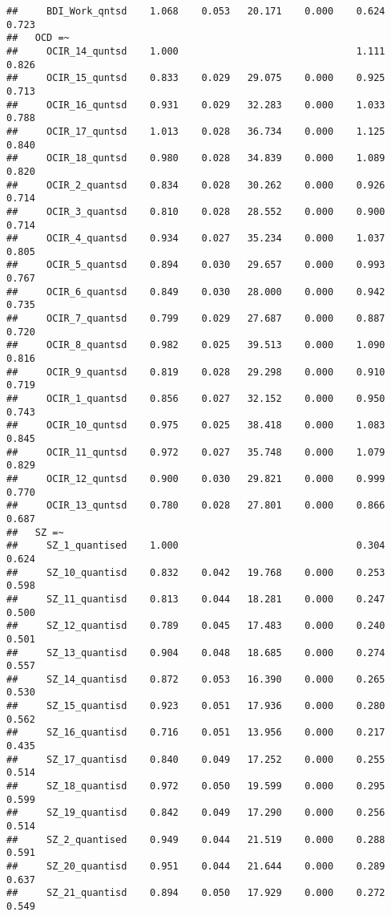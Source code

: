 \documentclass[]{article}
\begin{document}
\begin{verbatim}
##     BDI_Work_qntsd    1.068    0.053   20.171    0.000    0.624    0.723
##   OCD =~                                                                
##     OCIR_14_quntsd    1.000                               1.111    0.826
##     OCIR_15_quntsd    0.833    0.029   29.075    0.000    0.925    0.713
##     OCIR_16_quntsd    0.931    0.029   32.283    0.000    1.033    0.788
##     OCIR_17_quntsd    1.013    0.028   36.734    0.000    1.125    0.840
##     OCIR_18_quntsd    0.980    0.028   34.839    0.000    1.089    0.820
##     OCIR_2_quantsd    0.834    0.028   30.262    0.000    0.926    0.714
##     OCIR_3_quantsd    0.810    0.028   28.552    0.000    0.900    0.714
##     OCIR_4_quantsd    0.934    0.027   35.234    0.000    1.037    0.805
##     OCIR_5_quantsd    0.894    0.030   29.657    0.000    0.993    0.767
##     OCIR_6_quantsd    0.849    0.030   28.000    0.000    0.942    0.735
##     OCIR_7_quantsd    0.799    0.029   27.687    0.000    0.887    0.720
##     OCIR_8_quantsd    0.982    0.025   39.513    0.000    1.090    0.816
##     OCIR_9_quantsd    0.819    0.028   29.298    0.000    0.910    0.719
##     OCIR_1_quantsd    0.856    0.027   32.152    0.000    0.950    0.743
##     OCIR_10_quntsd    0.975    0.025   38.418    0.000    1.083    0.845
##     OCIR_11_quntsd    0.972    0.027   35.748    0.000    1.079    0.829
##     OCIR_12_quntsd    0.900    0.030   29.821    0.000    0.999    0.770
##     OCIR_13_quntsd    0.780    0.028   27.801    0.000    0.866    0.687
##   SZ =~                                                                 
##     SZ_1_quantised    1.000                               0.304    0.624
##     SZ_10_quantisd    0.832    0.042   19.768    0.000    0.253    0.598
##     SZ_11_quantisd    0.813    0.044   18.281    0.000    0.247    0.500
##     SZ_12_quantisd    0.789    0.045   17.483    0.000    0.240    0.501
##     SZ_13_quantisd    0.904    0.048   18.685    0.000    0.274    0.557
##     SZ_14_quantisd    0.872    0.053   16.390    0.000    0.265    0.530
##     SZ_15_quantisd    0.923    0.051   17.936    0.000    0.280    0.562
##     SZ_16_quantisd    0.716    0.051   13.956    0.000    0.217    0.435
##     SZ_17_quantisd    0.840    0.049   17.252    0.000    0.255    0.514
##     SZ_18_quantisd    0.972    0.050   19.599    0.000    0.295    0.599
##     SZ_19_quantisd    0.842    0.049   17.290    0.000    0.256    0.514
##     SZ_2_quantised    0.949    0.044   21.519    0.000    0.288    0.591
##     SZ_20_quantisd    0.951    0.044   21.644    0.000    0.289    0.637
##     SZ_21_quantisd    0.894    0.050   17.929    0.000    0.272    0.549

\end{verbatim}
\end{document}

